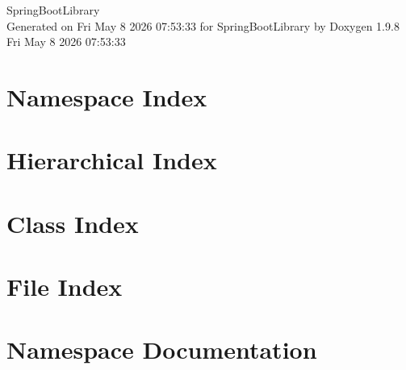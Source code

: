 \documentclass[twoside]{book}
\newcommand{\+}{\discretionary{\mbox{\scriptsize$\hookleftarrow$}}{}{}}
\newcommand{\clearemptydoublepage}{%
    \newpage{\pagestyle{empty}\cleardoublepage}%
  }
\begin{document}
  \raggedbottom
    \hypersetup{pageanchor=false,
                bookmarksnumbered=true,
                pdfencoding=unicode
               }
  \begin{titlepage}
  \vspace*{7cm}
  \begin{center}%
  {\Large Spring\+Boot\+Library}\\
  \vspace*{1cm}
  {\large Generated on Fri May 8 2026 07\+:53\+:33 for Spring\+Boot\+Library by Doxygen 1.9.8}\\
    \vspace*{0.5cm}
    {\small Fri May 8 2026 07:53:33}
  \end{center}
  \end{titlepage}
  \clearemptydoublepage
  \tableofcontents
  \clearemptydoublepage
  \hypersetup{pageanchor=true}
\chapter{Namespace Index}

\chapter{Hierarchical Index}

\chapter{Class Index}

\chapter{File Index}

\chapter{Namespace Documentation}








\end{document}
